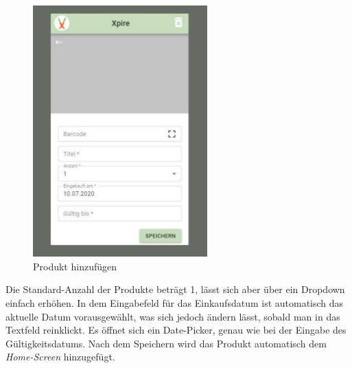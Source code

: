 \begin{figure}[h!]
	\centering
	\includegraphics[width=0.6\textwidth]{img/add.pdf}
	\caption{Produkt hinzufügen}
	\label{fig:add}
\end{figure}

Die Standard-Anzahl der Produkte beträgt 1, lässt sich aber über ein Dropdown einfach erhöhen. In dem Eingabefeld für das Einkaufsdatum ist automatisch das aktuelle Datum vorausgewählt, was sich jedoch ändern lässt, sobald man in das Textfeld reinklickt. Es öffnet sich ein Date-Picker, genau wie bei der Eingabe des Gültigkeitsdatums. Nach dem Speichern wird das Produkt automatisch dem \textit{Home-Screen} hinzugefügt.



